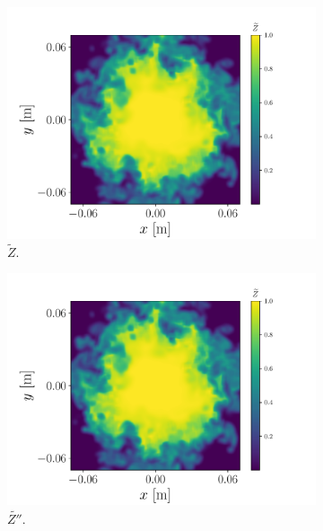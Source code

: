 \documentclass[review]{elsarticle}
\newcommand{\wt}[1]{\widetilde{#1}}
\begin{document}
\begin{figure}[!tbp]%
  \centering%
  \begin{subfigure}[t]{0.48\textwidth}%
    \includegraphics[page=1,width=\textwidth]{./figs/dice_0004_slice.pdf}%
    \caption{$\wt{Z}$.}%
  \end{subfigure}\hfill%
  \begin{subfigure}[t]{0.48\textwidth}%
    \includegraphics[page=2,width=\textwidth]{./figs/dice_0004_slice.pdf}%
    \caption{$\wt{Z''}$.}%
  \end{subfigure}\\%
  \begin{subfigure}[t]{0.48\textwidth}%

\end{subfigure}
\end{figure}
\end{document}
